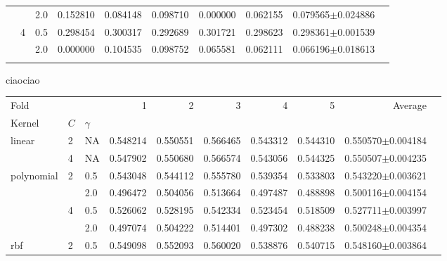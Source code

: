 \documentclass[nocrop]{bioinfo}
\begin{document}
\begin{supplementary}
\begin{table}[h]
{\begin{tabular}{lllrrrrrrr}
		&   & 2.0 & \num{0.152810} & \num{0.084148} & \num{0.098710} & \num{0.000000} & \num{0.062155} & \num{0.079565}$\pm$\num{0.024886} \\
		\cline{2-10}
		& \multirow{2}{*}{4} & 0.5 & \num{0.298454} & \num{0.300317} & \num{0.292689} & \num{0.301721} & \num{0.298623} & \num{0.298361}$\pm$\num{0.001539} \\
		&   & 2.0 & \num{0.000000} & \num{0.104535} & \num{0.098752} & \num{0.065581} & \num{0.062111} & \num{0.066196}$\pm$\num{0.018613} \\
		\botrule
	\end{tabular}
}{ciaociao}

\vspace{8pt}
 {
	\begin{tabular}{lllrrrrrrr}
		\toprule
Fold
		&   &     &              1 &              2 &              3 &              4 &              5 &        Average \\
		Kernel & $C$ & $\gamma$ &                &                &                &                &                &                &                \\
		\midrule
		\multirow{2}{*}{linear} & 2 & NA & \num{0.548214} & \num{0.550551} & \num{0.566465} & \num{0.543312} & \num{0.544310} & \num{0.550570}$\pm$\num{0.004184} \\
		& 4 & NA & \num{0.547902} & \num{0.550680} & \num{0.566574} & \num{0.543056} & \num{0.544325} & \num{0.550507}$\pm$\num{0.004235} \\
		\cline{1-10}
		\multirow{4}{*}{polynomial} & \multirow{2}{*}{2} & 0.5 & \num{0.543048} & \num{0.544112} & \num{0.555780} & \num{0.539354} & \num{0.533803} & \num{0.543220}$\pm$\num{0.003621} \\
		&   & 2.0 & \num{0.496472} & \num{0.504056} & \num{0.513664} & \num{0.497487} & \num{0.488898} & \num{0.500116}$\pm$\num{0.004154} \\
		\cline{2-10}
		& \multirow{2}{*}{4} & 0.5 & \num{0.526062} & \num{0.528195} & \num{0.542334} & \num{0.523454} & \num{0.518509} & \num{0.527711}$\pm$\num{0.003997} \\
		&   & 2.0 & \num{0.497074} & \num{0.504222} & \num{0.514401} & \num{0.497302} & \num{0.488238} & \num{0.500248}$\pm$\num{0.004354} \\
		\cline{1-10}
		\cline{2-10}
		\multirow{4}{*}{rbf} & \multirow{2}{*}{2} & 0.5 & \num{0.549098} & \num{0.552093} & \num{0.560020} & \num{0.538876} & \num{0.540715} & \num{0.548160}$\pm$\num{0.003864} \\

\end{tabular}}
\end{table}
\end{supplementary}
\end{document}
